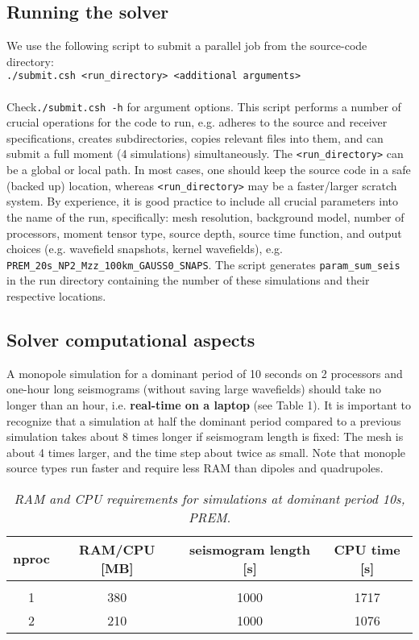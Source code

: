 \documentclass[11pt,letter,fleqn,english,notitlepage]{article}
\begin{document}
\subsection{Running the solver}
We use the following script to submit a parallel job from the source-code directory:\\
{\tt ./submit.csh <run\_directory> <additional arguments>}\\

\\ 
Check{\tt ./submit.csh -h} for argument options. 
This script performs a number of crucial operations for the code to run, e.g. adheres to 
the source and receiver specifications, creates subdirectories, copies relevant files into them,
and can submit a full moment (4 simulations) simultaneously.
The {\tt <run\_directory>} can be a global or local path. In most cases, one should keep the source code in a 
safe (backed up) location, whereas {\tt <run\_directory>} may be a faster/larger scratch system. 
By experience, it is good practice to include all crucial parameters into the name 
of the run, specifically: mesh resolution, background model, number of processors, 
moment tensor type, source depth, source time function, and output choices (e.g. wavefield snapshots, kernel wavefields), e.g.
{\tt PREM\_20s\_NP2\_Mzz\_100km\_GAUSS0\_SNAPS}. 
The script generates {\tt param\_sum\_seis} in the run directory containing the number of these simulations 
and their respective locations. 

\subsection{Solver computational aspects}
\noindent A monopole simulation for a dominant period of 10 seconds on 2 processors and 
one-hour long seismograms (without saving large wavefields) should take no longer than 
an hour, i.e. \textbf{real-time on a laptop} (see Table 1). 
It is important to recognize that a simulation at half the dominant period compared to a previous simulation 
takes about 8 times longer if seismogram length is fixed: The mesh is about 4 times larger, and the time step about twice as small.
Note that monople source types run faster and require less RAM than dipoles and quadrupoles.\\

\begin{table*}[htb] 
\begin{minipage}{150mm}
\caption{ \textit{RAM and CPU requirements for simulations at dominant period 10s, PREM}.}
\label{apptable:matrix_op}
\vspace*{.2cm}
\begin{tabular}{@{}cccc}
nproc & RAM/CPU [MB] & seismogram length [s]& CPU time [s]\\
\hline\\
1 & 380 & 1000 & 1717\\
2 & 210 & 1000 & 1076
\end{tabular}
\end{minipage}
\end{table*}
\end{document}
